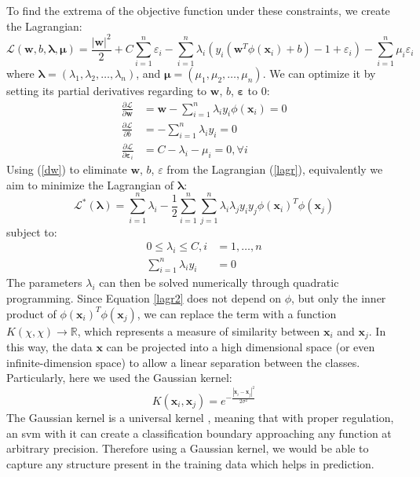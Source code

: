To find the extrema of the objective function under these constraints, we create the Lagrangian:
\begin{equation} \label{lagr}
    \mathcal{L}(\mathbf{w}, b, \mathbf{\lambda}, \mathbf{\mu})=\frac{|\mathbf{w}|^2}{2} + C\sum_{i=1}^n\varepsilon_i - \sum_{i=1}^n \lambda_i(y_i(\mathbf{w}^T\phi(\mathbf{x}_i) + b) - 1 + \varepsilon_i) - \sum_{i=1}^n \mu_i\varepsilon_i
\end{equation}
where $\mathbf{\lambda}=(\lambda_1, \lambda_2, \ldots, \lambda_n)$, and $\mathbf{\mu}=(\mu_1, \mu_2, \ldots, \mu_n)$. We can optimize it by setting its partial derivatives regarding to $\mathbf{w}$, $b$, $\mathbf{\varepsilon}$ to 0:
\begin{align}\label{dw}
    \frac{\partial\mathcal{L}}{\partial\mathbf{w}} &= \mathbf{w} - \sum_{i=1}^n \lambda_i  y_i  \phi(\mathbf{x}_i) = 0 \nonumber\\ 
    \frac{\partial\mathcal{L}}{\partial{b}} &= - \sum_{i=1}^n \lambda_i y_i = 0 \\
    \frac{\partial\mathcal{L}}{\partial{\mathbf{\varepsilon}_i}} &= C - \lambda_i - \mu_i = 0, \forall i  \nonumber 
\end{align}
Using (\ref{dw}) to eliminate $\mathbf{w}$, $b$, $\varepsilon$ from the Lagrangian (\ref{lagr}), equivalently we aim to minimize the Lagrangian of $\mathbf{\lambda}$:
\begin{equation} \label{lagr2}
    \mathcal{L}^*(\mathbf{\lambda}) = \sum_{i=1}^{n} \lambda_i - \frac{1}{2}\sum_{i=1}^n \sum_{j=1}^n \lambda_i \lambda_j y_i y_j \phi(\mathbf{x}_i)^T\phi(\mathbf{x}_j)
\end{equation}
subject to:
\begin{align*}
    0 \leq \lambda_i \leq C, i &= 1,\ldots,n \\
    \sum_{i=1}^n \lambda_i y_i &= 0
\end{align*}
The parameters $\lambda_i$ can then be solved numerically through quadratic programming. Since Equation \ref{lagr2} does not depend on $\phi$, but only the inner product of $\phi(\mathbf{x}_i)^T\phi(\mathbf{x}_j)$, we can replace the term with a function $K(\chi, \chi) \to \mathbb{R}$, which represents a measure of similarity between $\mathbf{x}_i$ and $ \mathbf{x}_j$. In this way, the data $\mathbf{x}$ can be projected into a high dimensional space (or even infinite-dimension space) to allow a linear separation between the classes. Particularly, here we used the Gaussian kernel:
\begin{equation*}
    K(\mathbf{x}_i, \mathbf{x}_j) = e^{-\frac{|\mathbf{x}_i - \mathbf{x}_j|^2}{2\sigma^2}}
\end{equation*}
The Gaussian kernel is a universal kernel \citep{park91}, meaning that with proper regulation, an \gls{svm} with it can create a classification boundary approaching any function at arbitrary precision. Therefore using a Gaussian kernel, we would be able to capture any structure present in the training data which helps in prediction.

